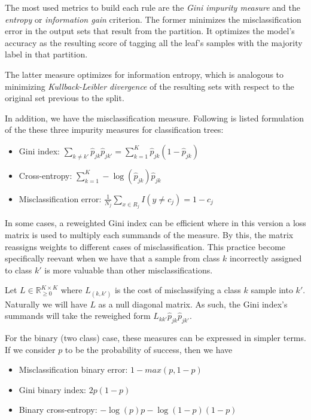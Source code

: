 The most used metrics to build each rule are the \textit{Gini impurity measure} and the \textit{entropy} or \textit{information gain} criterion.
The former minimizes the misclassification error in the output sets that result from the partition.
It optimizes the model's accuracy as the resulting score of tagging all the leaf's samples with the majority label in that partition.

The latter measure optimizes for information entropy, which is analogous to minimizing \textit{Kullback-Leibler divergence} of the resulting sets with respect to the original set previous to the split.

In addition, we have the misclassification measure.
Following is listed formulation of the these three impurity measures for classification trees:

\begin{itemize}
    \item Gini index: $ \displaystyle \sum_{k\neq k'} \hat{p}_{jk} \hat{p}_{jk'}  = \sum_{k=1}^{K} \hat{p}_{jk} (1 - \hat{p}_{jk}) $
    \item Cross-entropy: $ \displaystyle \sum_{k=1}^{K} -\log(\hat{p}_{jk})\hat{p}_{jk} $
    \item Misclassification error: $ \displaystyle \frac{1}{N_j} \sum_{x \in R_j} I(y\neq c_j) = 1 - c_j $
\end{itemize}

In some cases, a reweighted Gini index can be efficient where in this version a loss matrix is used to multiply each summands of the measure.
By this, the matrix reassigns weights to different cases of misclassification.
This practice become specifically reevant when we have that a sample from class $k$ incorrectly assigned to class $k'$ is more valuable than other misclassifications.

Let $L \in \mathbb R_{\ge 0}^{K \times K}$ where $L_{(k,k')}$ is the cost of misclassifying a class $k$ sample into $k'$.
Naturally we will have $L$ as a null diagonal matrix.
As such, the Gini index's summands will take the reweighed form $L_{kk'} \hat{p}_{jk} \hat{p}_{jk'}$.

For the binary (two class) case, these measures can be expressed in simpler terms.
If we consider $p$ to be the probability of success, then we have

\begin{itemize}
\item Misclassification binary error: $1 - max(p, 1-p)$ \label{it:decisionTreeCostFunctions}
\item Gini binary index: $ 2p(1-p) $
\item Binary cross-entropy: $ -\log(p)p - \log(1- p)(1-p) $
\end{itemize}


